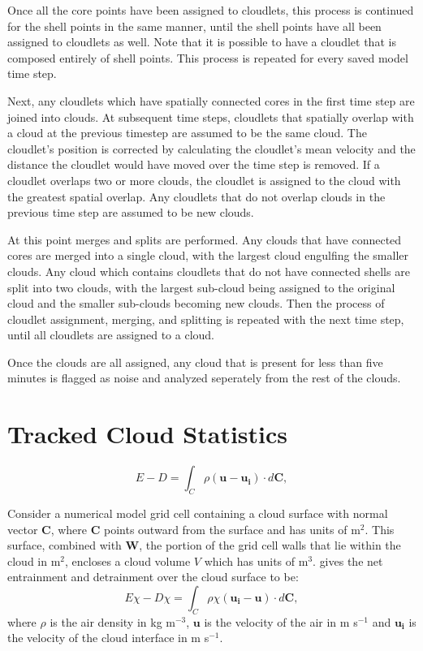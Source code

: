 \documentclass[12pt]{article}
\begin{document}
Once all the core points have been assigned to cloudlets, this process is 
continued for the shell points in the same manner, until the shell points have 
all been assigned to cloudlets as well.  Note that it is possible to have a 
cloudlet that is composed entirely of shell points.  This process is repeated 
for every saved model time step.

Next, any cloudlets which have spatially connected cores in the first time step 
are joined into clouds.  At subsequent time steps, cloudlets that spatially 
overlap with a cloud at the previous timestep are assumed to be the same cloud.
The cloudlet's position is corrected by calculating the cloudlet's mean 
velocity and the distance the cloudlet would have moved over the time step is 
removed.  If a cloudlet overlaps two or more clouds, the cloudlet is assigned 
to the cloud with the greatest spatial overlap.  Any cloudlets that do not 
overlap clouds in the previous time step are assumed to be new clouds.

At this point merges and splits are performed.  Any clouds that have connected 
cores are merged into a single cloud, with the largest cloud engulfing the 
smaller clouds.  Any cloud which contains cloudlets that do not have connected
shells are split into two clouds, with the largest sub-cloud being assigned to 
the original cloud and the smaller sub-clouds becoming new clouds.  Then the 
process of cloudlet assignment, merging, and splitting is repeated with the 
next time step, until all cloudlets are assigned to a cloud.

Once the clouds are all assigned, any cloud that is present for less than 
five minutes is flagged as noise and analyzed seperately from the rest of 
the clouds.


\section{Tracked Cloud Statistics}


\begin{equation}
\label{eq:E_minus_D} 
E - D = \int_C \rho ( \mathbf{u} -  \mathbf{u_i}) \cdot d\mathbf{C},
\end{equation}



Consider a numerical model grid cell containing a cloud surface with normal 
vector $\mathbf{C}$, where $\mathbf{C}$ points outward from the surface and 
has units of m$^2$.  This surface, combined with $\mathbf{W}$, the portion of 
the grid cell walls that lie within the cloud in m$^2$, encloses a cloud volume 
$V$ which has units of m$^3$.  \cite{Siebesma1998} gives the net entrainment and 
detrainment over the cloud surface to be:
\begin{equation}
\label{eq:Echi_minus_Dchi} 
E\chi - D\chi = \int_C \rho \chi ( \mathbf{u_i} -  \mathbf{u}) \cdot d\mathbf{C},
\end{equation}
where $\rho$ is the air density in kg m$^{-3}$, $\mathbf{u}$ is the velocity
of the air in m s$^{-1}$ and $\mathbf{u_i}$ is the velocity of the cloud 
interface in m s$^{-1}$.
\end{document}

